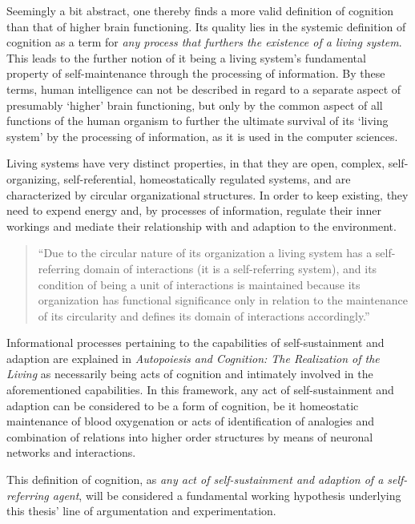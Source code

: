 Seemingly a bit abstract, one thereby finds a more valid definition of cognition than that of higher brain functioning. Its quality lies in the systemic definition of cognition as a term for \textit{any process that furthers the existence of a living system}. This leads to the further notion of it being a living system's fundamental property of self-maintenance through the processing of information. By these terms, human intelligence can not be described in regard to a separate aspect of presumably `higher' brain functioning, but only by the common aspect of all functions of the human organism to further the ultimate survival of its `living system' by the processing of information, as it is used in the computer sciences.

Living systems have very distinct properties, in that they are open, complex, self-organizing, self-referential, homeostatically regulated systems, and are characterized by circular organizational structures. In order to keep existing, they need to expend energy and, by processes of information, regulate their inner workings and mediate their relationship with and adaption to the environment.

\begin{quotation}
``Due to the circular nature of its organization a living system has a self-referring domain of interactions (it is a self-referring system), and its condition of being a unit of interactions is maintained because its organization has functional significance only in relation to the maintenance of its circularity and defines its domain of interactions accordingly.'' \newline\indent\citep{Maturana1980}
\end{quotation} 

Informational processes pertaining to the capabilities of self-sustainment and adaption are explained in \textit{Autopoiesis and Cognition: The Realization of the Living} \citep{Maturana1980} as necessarily being acts of cognition and intimately involved in the aforementioned capabilities. In this framework, any act of self-sustainment and adaption can be considered to be a form of cognition, be it homeostatic maintenance of blood oxygenation or acts of identification of analogies and combination of relations into higher order structures by means of neuronal networks and interactions.

This definition of cognition, as \emph{any act of self-sustainment and adaption of a self-referring agent}, will be considered a fundamental working hypothesis underlying this thesis' line of argumentation and experimentation.

